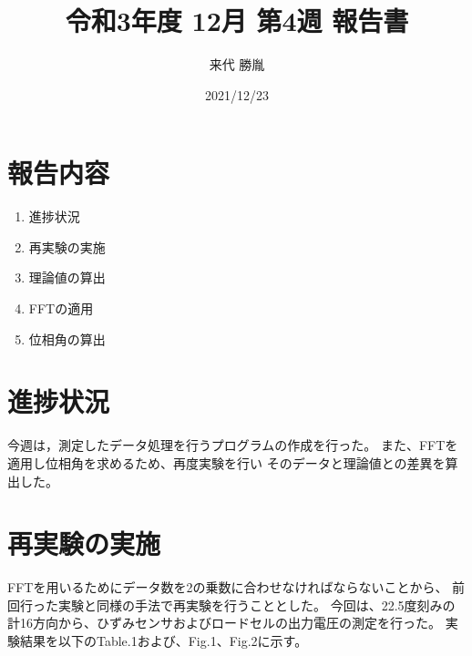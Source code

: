 \documentclass[twocolumn,a4j]{jsarticle}
\author{来代 勝胤}
\title{令和3年度 12月 第4週 報告書}
\date{2021/12/23}
\begin{document}
\columnseprule=0.1mm

\maketitle
\section*{報告内容}
\begin{enumerate}[1.]
    \item 進捗状況
    \item 再実験の実施
    \item 理論値の算出
    \item FFTの適用
    \item 位相角の算出
\end{enumerate}

\section{進捗状況}
今週は，測定したデータ処理を行うプログラムの作成を行った。
また、FFTを適用し位相角を求めるため、再度実験を行い
そのデータと理論値との差異を算出した。

\section{再実験の実施}
FFTを用いるためにデータ数を2の乗数に合わせなければならないことから、
前回行った実験と同様の手法で再実験を行うこととした。
今回は、22.5度刻みの計16方向から、ひずみセンサおよびロードセルの出力電圧の測定を行った。
実験結果を以下のTable.1および、Fig.1、Fig.2に示す。\\
\end{document}
